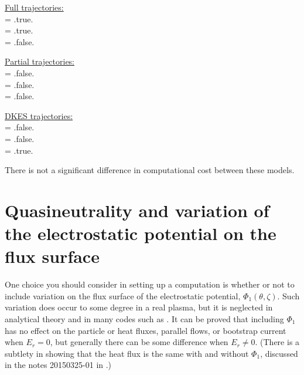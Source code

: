 {\setlength{\parindent}{0cm}

\underline{Full trajectories:}\\
{\ttfamily 
{} = .true.\\
 = .true.\\
 = .false.\\
}

\underline{Partial trajectories:}\\
{\ttfamily
{} = .false.\\
 = .false.\\
 = .false.\\
}

\underline{DKES trajectories:}\\
{\ttfamily
{} = .false.\\
 = .false.\\
 = .true.\\
}
}

There is not a significant difference in computational cost between these models.


\section{Quasineutrality and variation of the electrostatic potential on the flux surface}

One choice you should consider in setting up a computation is whether or not
to include variation on the flux surface of the electrostatic potential, $\Phi_1(\theta,\zeta)$.
Such variation does occur to some degree in a real plasma, but it is 
neglected in analytical theory and in many codes such as \dkes.  It can be proved
that including $\Phi_1$ has no effect on the particle or heat fluxes, parallel flows, or bootstrap current
when $E_r=0$, but generally there can be some difference when $E_r \ne 0$.
(There is a subtlety in showing that the heat flux is the same with and without $\Phi_1$,
discussed in the notes 20150325-01 in .)

